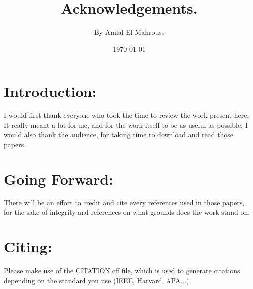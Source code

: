 \documentclass[10pt]{article}
\title{%
	\vspace{-1.5em}%
	\large\textbf{Acknowledgements.}%
}
\author{By Amlal El Mahrouss}
\date{\today}
\theoremstyle{plain}
\theoremstyle{definition}
\theoremstyle{remark}
\begin{document}

\maketitle

\section{Introduction:}

I would first thank everyone who took the time to review the work present here, It really meant a lot for me, and for the work itself to be as useful as possible. I would also thank the audience, for taking time to download and read those papers.

\section{Going Forward:}

There will be an effort to credit and cite every references used in those papers, for the sake of integrity and references on what grounds does the work stand on.

\section{Citing:}

Please make use of the CITATION.cff file, which is used to generate citations depending on the standard you use (IEEE, Harvard, APA...).

\end{document}
